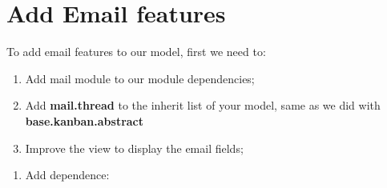 \documentclass[letterpaper,10pt,english]{sphinxmanual}
\begin{document}
\section{Add Email features}
\label{index:add-email-features}
To add email features to our model, first we need to:
\begin{enumerate}
\item {} 
Add mail module to our module dependencies;

\item {} 
Add \textbf{mail.thread} to the inherit list of your model, same as we did with \textbf{base.kanban.abstract}

\item {} 
Improve the view to display the email fields;

\end{enumerate}
\begin{enumerate}
\item {} 
Add dependence:

\end{enumerate}
\end{document}
